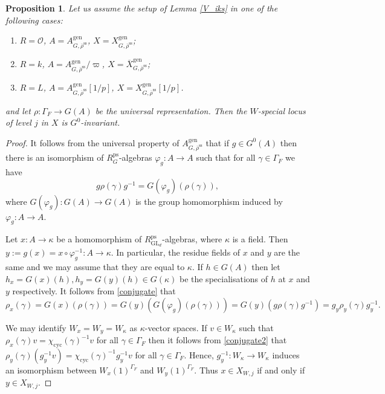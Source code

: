 \documentclass{amsart}
\newtheorem{prop}{Proposition}[section]
\theoremstyle{definition}
\theoremstyle{remark}
\DeclareMathOperator{\GL}{GL}
\newcommand{\OO}{\mathcal O}
\newcommand{\rhobar}{\overline{\rho}}
\newcommand{\ps}{\mathrm{ps}}
\newcommand{\gen}{\mathrm{gen}}
\newcommand{\cyc}{\mathrm{cyc}}
\newcommand{\RpsGLd}{R^{\ps}_{\GL_d}}
\newcommand{\RpsG}{R^{\ps}_G}
\newcommand{\XgenGrhobarss}{X^{\gen}_{G,\rhobarss}}
\newcommand{\rhobarss}{\rhobar^{\mathrm{ss}}}
\begin{document}
\begin{prop}\label{setup} Let us assume the setup of Lemma \ref{V_iks} in one of the following cases:
\begin{enumerate}
\item $R=\OO$, $A=A^{\gen}_{G, \rhobarss}$, $X=\XgenGrhobarss$;
\item $R=k$, $A=A^{\gen}_{G, \rhobarss} /\varpi$, $X= \overline X^{\gen}_{G, \rhobarss}$;
\item $R=L$, $A= A^{\gen}_{G, \rhobarss}[1/p]$, $X= \XgenGrhobarss[1/p]$.
\end{enumerate}
and let
$\rho: \Gamma_F \rightarrow G(A)$ be the universal
representation. Then the $W$-special locus of level $j$ in $X$ is $G^0$-invariant.
\end{prop} 
\begin{proof} It follows from the universal property of $A^{\gen}_{G,\rhobarss}$ that 
if $g\in G^0(A)$ then there is an isomorphism of $\RpsG$-algebras
$\varphi_g: A\rightarrow A$ such that for all $\gamma\in \Gamma_F$ we have 
\begin{equation}\label{conjugate}
g \rho(\gamma) g^{-1} = G(\varphi_g)( \rho(\gamma)),
\end{equation}
where $G(\varphi_g): G(A)\rightarrow G(A)$ is the group homomorphism 
induced by $\varphi_g: A\rightarrow A$. 

 Let $x: A\rightarrow \kappa$ 
be a homomorphism of $\RpsGLd$-algebras, where $\kappa$ 
is a field. Then 
$y:= g(x)= x\circ \varphi_g^{-1}: A\rightarrow \kappa$. In particular, the residue 
fields of $x$ and $y$ are the same and we may assume that they are equal to $\kappa$. 
If $h\in G(A)$ then 
let $h_x= G(x)(h), h_y= G(y)(h)\in G(\kappa)$ be the specialisations of $h$ at $x$ and $y$ respectively.
It follows from \eqref{conjugate} that 
\begin{equation}\label{conjugate2}
\rho_x(\gamma)= G(x)(\rho(\gamma))= G(y)( G(\varphi_g)( \rho(\gamma)))= G(y)(g \rho(\gamma) g^{-1})= g_y \rho_y(\gamma) g_y^{-1}.
\end{equation}

We may identify $W_x= W_y= W_{\kappa}$ as $\kappa$-vector spaces. 
If $v\in W_{\kappa}$ such that $\rho_x(\gamma)v = \chi_{\cyc}(\gamma)^{-1} v$ for all 
$\gamma\in \Gamma_F$ then it follows from \eqref{conjugate2} that 
 $\rho_y(\gamma) ( g_y^{-1} v) = \chi_{\cyc}(\gamma)^{-1}  g_y^{-1} v$ for all 
$\gamma\in \Gamma_F$. Hence, $g_y^{-1}: W_{\kappa} \rightarrow W_{\kappa}$ induces 
an isomorphism between $W_{x}(1)^{\Gamma_F}$ and $W_y(1)^{\Gamma_F}$. Thus 
$x\in X_{W,j}$ if and only if $y\in X_{W, j}$. 
\end{proof} 
\end{document}
